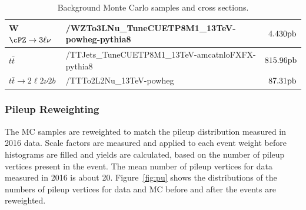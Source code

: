 \begin{table}
\begin{footnotesize}
{\begin{tabular}{|l|l|r|}
 W$\cPZ \to 3\ell\nu$ & /WZTo3LNu\_TuneCUETP8M1\_13TeV-powheg-pythia8 & $4.430 \rm{ pb}$ \\ \hline
 $t\bar{t}$ & /TTJets\_TuneCUETP8M1\_13TeV-amcatnloFXFX-pythia8 & $815.96 \rm{ pb}$ \\ 
 $t\bar{t} \to 2\ell2\nu 2b$ & /TTTo2L2Nu\_13TeV-powheg &  $87.31 \rm{pb}$ \\ \hline
 \end{tabular}}
 \caption{Background Monte Carlo samples and cross sections.}
  \label{tab:MCsamples}
\end{footnotesize}
\end{table}

\subsubsection{Pileup Reweighting}

The MC samples are reweighted to match the pileup distribution measured in 2016 data. Scale factors are measured and applied to each event weight before histograms are filled and yields are calculated, based on the number of pileup vertices present in the event. The mean number of pileup vertices for data measured in 2016 is about 20. Figure~\ref{fig:pu} shows the distributions of the numbers of pileup vertices for data and MC before and after the events are reweighted.

